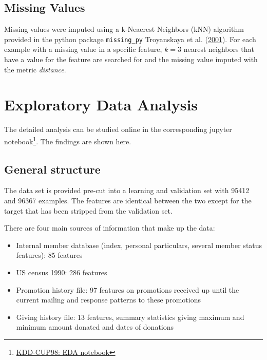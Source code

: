 \documentclass[
  11pt,
  a4paper,
  DIV=12,captions=tableheading,oneside]{scrbook}
\providecommand{\tightlist}{%
  \setlength{\itemsep}{0pt}\setlength{\parskip}{0pt}}
\providecommand{\tightlist}{%
  \setlength{\itemsep}{0pt}\setlength{\parskip}{0pt}}
\begin{document}
\hypertarget{missing-values}{%
\subsection{Missing Values}\label{missing-values}}

Missing values were imputed using a k-Neaerest Neighbors (kNN) algorithm provided in the python package \texttt{missing\_py} Troyanskaya et al. (\protect\hyperlink{ref-troyanskaya2001missing}{2001}). For each example with a missing value in a specific feature, \(k=3\) nearest neighbors that have a value for the feature are searched for and the missing value imputed with the metric \emph{distance}.

\hypertarget{exploratory-data-analysis}{%
\section{Exploratory Data Analysis}\label{exploratory-data-analysis}}

The detailed analysis can be studied online in the corresponding jupyter notebook\footnote{\href{https://github.com/datarian/master-thesis-code/blob/development/notebooks/eda.ipynb}{KDD-CUP98: EDA notebook}}. The findings are shown here.

\hypertarget{general-structure}{%
\subsection{General structure}\label{general-structure}}

The data set is provided pre-cut into a learning and validation set with 95412 and 96367 examples. The features are identical between the two except for the target that has been stripped from the validation set.

There are four main sources of information that make up the data:

\begin{itemize}
\tightlist
\item
  Internal member database (index, personal particulars, several member status features): 85 features
\item
  US census 1990: 286 features
\item
  Promotion history file: 97 features on promotions received up until the current mailing and response patterns to these promotions
\item
  Giving history file: 13 features, summary statistics giving maximum and minimum amount donated and dates of donations
\end{itemize}
\end{document}

